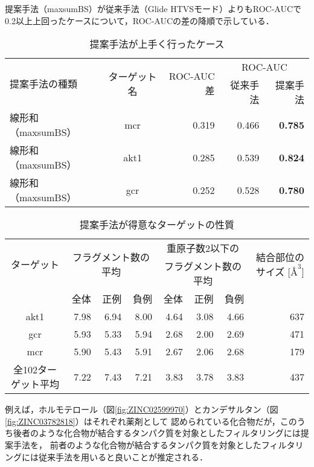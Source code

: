 \begin{table}[hb] \centering
	\caption{提案手法が上手く行ったケース}
	\label{table:target_accuracy_good}
	提案手法（maxsumBS）が従来手法（Glide HTVSモード）よりもROC-AUCで\\
	0.2以上上回ったケースについて，ROC-AUCの差の降順で示している．
	\begin{tabular}{lc|r|rr}
	\hline
	\multirow{2}{*}{提案手法の種類}	&\multirow{2}{*}{ターゲット名}	&\multirow{2}{*}{ROC-AUC差}	&\multicolumn{2}{c}{ROC-AUC}	\\
								&						&							&従来手法	&提案手法		\\ \hline
	線形和（maxsumBS）			&mcr					&0.319						&0.466		&{\bf 0.785}		\\
	線形和（maxsumBS）			&akt1					&0.285						&0.539		&{\bf 0.824}		\\
	線形和（maxsumBS）			&gcr						&0.252						&0.528		&{\bf 0.780}		\\ \hline
	\end{tabular}
\end{table}
\begin{table}[htb] \centering
	\caption{提案手法が得意なターゲットの性質}
	\label{table:good_property}
	\begin{tabular}{c|rrrrrrr}
	\hline
	\multirow{2}{*}{ターゲット}	&\multicolumn{3}{c}{\multirow{2}{*}{フラグメント数の平均}}	&\multicolumn{3}{c}{重原子数2以下の}		&\multirow{2}{*}{結合部位のサイズ [$Å^3$]}	\\
							&		&		&								&\multicolumn{3}{c}{フラグメント数の平均}	&										\\
							&全体	&正例	&負例							&全体	&正例		&負例			&										\\ \hline
	akt1						&7.98	&6.94	&8.00							&4.64	&3.08		&4.66			&637									\\
	gcr						&5.93	&5.33	&5.94							&2.68	&2.00		&2.69			&471									\\
	mcr						&5.90	&5.43	&5.91							&2.67	&2.06		&2.68			&179									\\ \hline
	全102ターゲット平均		&7.22	&7.43	&7.21							&3.83	&3.78		&3.83			&437									\\ \hline
	\end{tabular}
\end{table}

\newpage

例えば，ホルモテロール（図\ref{fig:ZINC02599970}）とカンデサルタン（図\ref{fig:ZINC03782818}）はそれぞれ薬剤として
認められている化合物だが，このうち後者のような化合物が結合するタンパク質を対象としたフィルタリングには提案手法を，
前者のような化合物が結合するタンパク質を対象としたフィルタリングには従来手法を用いると良いことが推定される．

